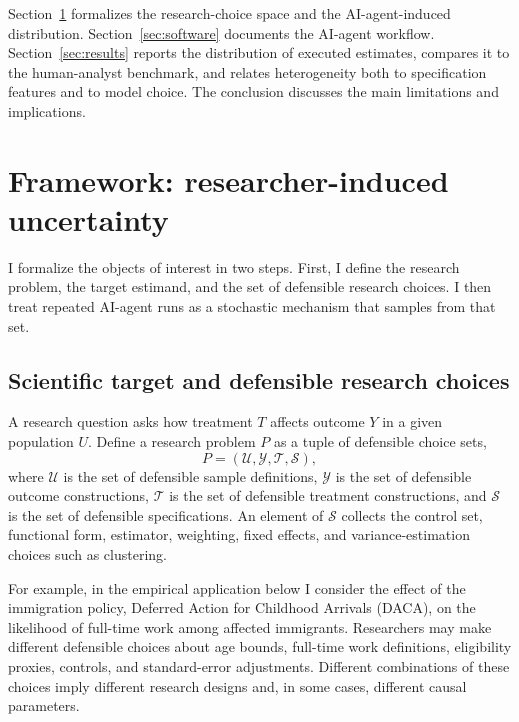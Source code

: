\documentclass[12pt]{article}
\begin{document}
Section~\ref{sec:framework} formalizes the research-choice space and the AI-agent-induced distribution. Section~\ref{sec:software} documents the AI-agent workflow. Section~\ref{sec:results} reports the distribution of executed estimates, compares it to the human-analyst benchmark, and relates heterogeneity both to specification features and to model choice. The conclusion discusses the main limitations and implications.

\section{Framework: researcher-induced uncertainty}
\label{sec:framework}

I formalize the objects of interest in two steps. First, I define the research problem, the target estimand, and the set of defensible research choices. I then treat repeated AI-agent runs as a stochastic mechanism that samples from that set.

\subsection{Scientific target and defensible research choices}
\label{sec:framework_target}

A research question asks how treatment $T$ affects outcome $Y$ in a given population $U$. Define a research problem $P$ as a tuple of defensible choice sets,
\[
P = (\mathcal{U},\mathcal{Y},\mathcal{T},\mathcal{S}),
\]
where $\mathcal{U}$ is the set of defensible sample definitions, $\mathcal{Y}$ is the set of defensible outcome constructions, $\mathcal{T}$ is the set of defensible treatment constructions, and $\mathcal{S}$ is the set of defensible specifications. An element of $\mathcal{S}$ collects the control set, functional form, estimator, weighting, fixed effects, and variance-estimation choices such as clustering.

For example, in the empirical application below I consider the effect of the immigration policy, Deferred Action for Childhood Arrivals (DACA), on the likelihood of full-time work among affected immigrants. Researchers may make different defensible choices about age bounds, full-time work definitions, eligibility proxies, controls, and standard-error adjustments. Different combinations of these choices imply different research designs and, in some cases, different causal parameters.
\end{document}
